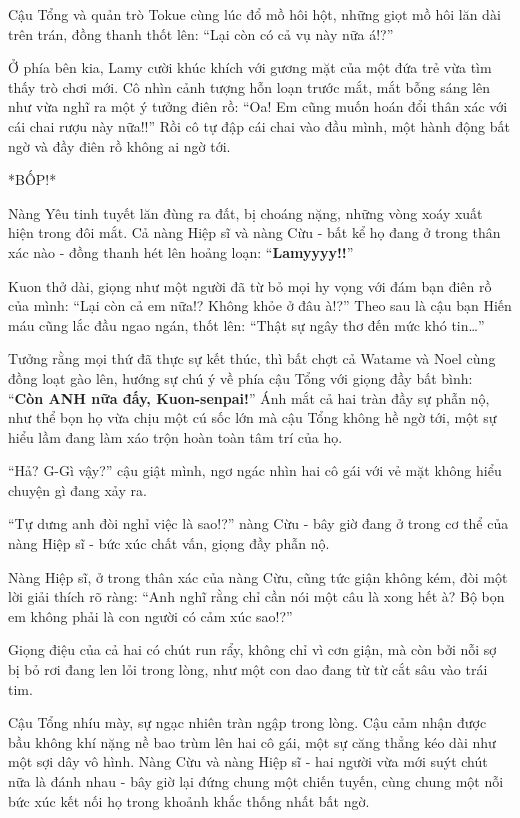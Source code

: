 \documentclass[../main.tex]{subfiles}
\begin{document}

Cậu Tổng và quản trò Tokue cùng lúc đổ mồ hôi hột, những giọt mồ hôi lăn dài trên trán, đồng thanh thốt lên: ``Lại còn có cả vụ này nữa á!?''

Ở phía bên kia, Lamy cười khúc khích với gương mặt của một đứa trẻ vừa tìm thấy trò chơi mới. Cô nhìn cảnh tượng hỗn loạn trước mắt, mắt bỗng sáng lên như vừa nghĩ ra một ý tưởng điên rồ: ``Oa! Em cũng muốn hoán đổi thân xác với cái chai rượu này nữa!!'' Rồi cô tự đập cái chai vào đầu mình, một hành động bất ngờ và đầy điên rồ không ai ngờ tới.

*BỐP!*


Nàng Yêu tinh tuyết lăn đùng ra đất, bị choáng nặng, những vòng xoáy xuất hiện trong đôi mắt. Cả nàng Hiệp sĩ và nàng Cừu - bất kể họ đang ở trong thân xác nào - đồng thanh hét lên hoảng loạn: ``\textbf{Lamyyyy!!}''

Kuon thở dài, giọng như một người đã từ bỏ mọi hy vọng với đám bạn điên rồ của mình: ``Lại còn cả em nữa!? Không khỏe ở đâu à!?'' Theo sau là cậu bạn Hiến máu cũng lắc đầu ngao ngán, thốt lên: ``Thật sự ngây thơ đến mức khó tin\dots''

Tưởng rằng mọi thứ đã thực sự kết thúc, thì bất chợt cả Watame và Noel cùng đồng loạt gào lên, hướng sự chú ý về phía cậu Tổng với giọng đầy bất bình: ``\textbf{Còn ANH nữa đấy, Kuon-senpai!}'' Ánh mắt cả hai tràn đầy sự phẫn nộ, như thể bọn họ vừa chịu một cú sốc lớn mà cậu Tổng không hề ngờ tới, một sự hiểu lầm đang làm xáo trộn hoàn toàn tâm trí của họ.

``Hả? G-Gì vậy?'' cậu giật mình, ngơ ngác nhìn hai cô gái với vẻ mặt không hiểu chuyện gì đang xảy ra.

``Tự dưng anh đòi nghỉ việc là sao!?'' nàng Cừu - bây giờ đang ở trong cơ thể của nàng Hiệp sĩ - bức xúc chất vấn, giọng đầy phẫn nộ.

Nàng Hiệp sĩ, ở trong thân xác của nàng Cừu, cũng tức giận không kém, đòi một lời giải thích rõ ràng: ``Anh nghĩ rằng chỉ cần nói một câu là xong hết à? Bộ bọn em không phải là con người có cảm xúc sao!?''

Giọng điệu của cả hai có chút run rẩy, không chỉ vì cơn giận, mà còn bởi nỗi sợ bị bỏ rơi đang len lỏi trong lòng, như một con dao đang từ từ cắt sâu vào trái tim.

Cậu Tổng nhíu mày, sự ngạc nhiên tràn ngập trong lòng. Cậu cảm nhận được bầu không khí nặng nề bao trùm lên hai cô gái, một sự căng thẳng kéo dài như một sợi dây vô hình. Nàng Cừu và nàng Hiệp sĩ - hai người vừa mới suýt chút nữa là đánh nhau - bây giờ lại đứng chung một chiến tuyến, cùng chung một nỗi bức xúc kết nối họ trong khoảnh khắc thống nhất bất ngờ.
\end{document}
